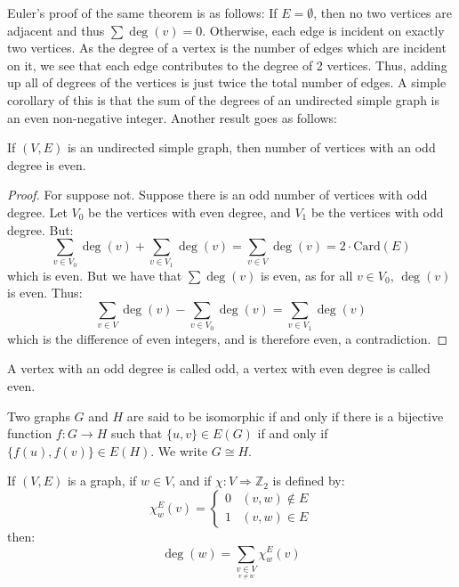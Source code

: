     Euler's proof of the same theorem is as follows:
    If $E=\emptyset$, then no two vertices are adjacent and thus
    $\sum\deg(v)=0$. Otherwise, each edge is incident on exactly two
    vertices. As the degree of a vertex is the number of edges which are
    incident on it, we see that each edge contributes to the degree of 2
    vertices. Thus, adding up all of degrees of the vertices is just twice
    the total number of edges. A simple corollary of this is that the sum of
    the degrees of an undirected simple graph is an even non-negative
    integer. Another result goes as follows:
    \begin{theorem}
        If $(V,E)$ is an undirected simple graph, then number of vertices
        with an odd degree is even.
    \end{theorem}
    \begin{proof}
        For suppose not. Suppose there is an odd number of vertices with odd
        degree. Let $V_0$ be the vertices with even degree, and $V_1$ be the
        vertices with odd degree. But:
        \begin{equation}
            \sum_{v\in{V_{0}}}\deg(v)+\sum_{v\in{V_{1}}}\deg(v)
            =\sum_{v\in{V}}\deg(v)
            =2\cdot\mathrm{Card}(E)
        \end{equation}
        which is even. But we have that
        $\sum\deg(v)$ is even, as for all $v\in V_{0}$, $\deg(v)$ is even.
        Thus:
        \begin{equation}
            \sum_{v\in{V}}\deg(v)-\sum_{v\in{V_{0}}}\deg(v)
            =\sum_{v\in{V_{1}}}\deg(v)
        \end{equation}
        which is the difference of even integers, and is therefore even,
        a contradiction.
    \end{proof}
    \begin{definition}
        A vertex with an odd degree is called odd,
        a vertex with even degree is called even.
    \end{definition}
    \begin{definition}
        Two graphs $G$ and $H$ are said to be isomorphic if and only if
        there is a bijective function $f:G\rightarrow H$ such that
        $\{u,v\}\in E(G)$ if and only if $\{f(u),f(v)\}\in E(H)$. We write
        $G \cong H$.
    \end{definition}
    \begin{theorem}
        If $(V,E)$ is a graph, if $w\in{V}$, and if
        $\chi:V\Rightarrow\mathbb{Z}_{2}$ is defined by:
        \begin{equation}
            \chi_{w}^{E}(v)=
            \begin{cases}
                0&(v,w)\notin{E}\\
                1&(v,w)\in{E}
            \end{cases}
        \end{equation}
        then:
        \begin{equation}
            \deg(w)=\sum_{\underset{v\ne{w}}{v\in{V}}}\chi_{w}^{E}(v)
        \end{equation}
    \end{theorem}
